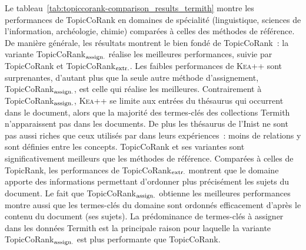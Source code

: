         Le tableau~\ref{tab:topiccorank-comparison_results_termith} montre les
        performances de TopicCoRank en domaines de spécialité (linguistique,
        sciences de l'information, archéologie, chimie) comparées à celles des
        méthodes de référence. De manière générale, les résultats montrent le
        bien fondé de TopicCoRank~: la variante
        TopicCoRank$_\textnormal{assign.}$ réalise les meilleures performances,
        suivie par TopicCoRank et TopicCoRank$_\textnormal{extr.}$. Les faibles
        performances de \textsc{Kea++} sont surprenantes, d'autant plus que la
        seule autre méthode d'assignement, TopicCoRank$_\textnormal{assign.}$,
        est celle qui réalise les meilleures. Contrairement à
        TopicCoRank$_\textnormal{assign.}$, \textsc{Kea++} se limite aux entrées
        du thésaurus qui occurrent dans le document, alors que la majorité des
        termes-clés des collections Termith n'apparaissent pas dans les
        documents. De plus les thésaurus de l'Inist ne sont pas aussi riches que
        ceux utilisés par  dans leurs expériences~:
        moins de relations y sont définies entre les concepts. TopicCoRank et
        ses variantes sont significativement meilleurs que les méthodes de
        référence. Comparées à celles de TopicRank, les performances de
        TopicCoRank$_\textnormal{extr.}$ montrent que le domaine apporte des
        informations permettant d'ordonner plus précisément les sujets du
        document. Le fait que TopicCoRank$_\textnormal{assign.}$ obtienne les
        meilleures performances montre aussi que les termes-clés du domaine sont
        ordonnés efficacement d'après le contenu du document (ses sujets). La
        prédominance de termes-clés à assigner dans les données Termith est la
        principale raison pour laquelle la variante
        TopicCoRank$_\textnormal{assign.}$ est plus performante que TopicCoRank.
